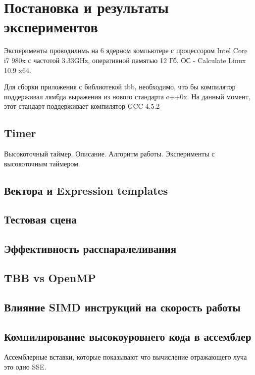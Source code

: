 \newpage
\section{Постановка и результаты экспериментов}

Эксперименты проводилимь на 6 ядерном компьютере с процессором Intel Core i7 980x с частотой 3.33GHz, оперативной памятью 12 Гб, ОС - Calculate Linux 10.9 x64. 

Для сборки приложения с библиотекой tbb, необходимо, что бы компилятор поддерживал лямбда выражения из нового стандарта c++0x. На данный момент, этот стандарт поддерживает компилятор GCC 4.5.2

\subsection{Timer}
Высокоточный таймер. Описание. Алгоритм работы. Эксперименты с высокоточным таймером.

\subsection{Вектора и Expression templates}

\subsection{Тестовая сцена}

\subsection{Эффективность расспаралеливания}

\subsection{TBB vs OpenMP}

\subsection{Влияние SIMD инструкций на скорость работы}

\subsection{Компилирование высокоуровнего кода в ассемблер}

Ассемблерные вставки, которые показывают что вычисление отражающего луча это одно SSE.

